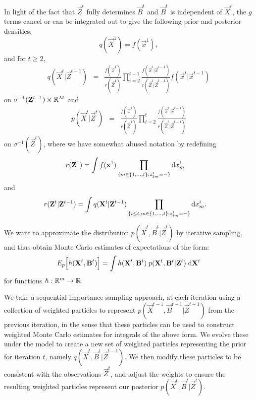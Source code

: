 In light of the fact that $\vec{Z}^t$ fully determines $\vec{B}^t$ and $\vec{B}^t$ is independent of $\vec{X}^t$, the $g$ terms cancel or can be integrated out to give the following prior and posterior densities:
\[
q(\vec{X}^1) = f(\vec{x}^1),
\]
and for $t \geq 2$,
\begin{eqnarray*}
    q(\vec{X}^t | \vec{Z}^{t-1}) & = & \frac{f(\vec{x}^1)}{r(\vec{Z}^1)} \prod_{i=2}^{t-1} \frac{f(\vec{x}^i | \vec{x}^{i-1}) }{r(\vec{Z}^t | \vec{Z}^{t-1})} f(\vec{x}^t | \vec{x}^{t-1})
\end{eqnarray*}
on $\sigma^{-1}(\mathbf{Z}^{t-1}) \times \mathbb R^M $ and 
\begin{eqnarray*}
    p(\vec{X}^t | \vec{Z}^t) 
& = & \frac{f(\vec{x}^1)}{r(\vec{Z}^1)} \prod_{i=2}^t \frac{f(\vec{x}^i | \vec{x}^{i-1}) }{r(\vec{Z}^t | \vec{Z}^{t-1})} 
\end{eqnarray*}
on $\sigma^{-1}(\vec{Z}^t)$, where we have somewhat abused notation by redefining
\begin{align*}
    r(\mathbf{Z}^1)  &= \int f(\mathbf{x}^1) \prod_{ \{m \in \{1, \ldots, t \} : z^1_{1m} = - \} } \mathrm{d} x^1_m
\end{align*}
and
\begin{align*}
    r(\mathbf{Z}^t | \mathbf{Z}^{t-1})  &= \int q(\mathbf{X}^t | \mathbf{Z}^{t-1}) \prod_{ \{ i \leq t, m \in \{1, \ldots, t \} : z^t_{im} = - \} } \mathrm{d} x^i_m.
\end{align*}



We want to approximate the distribution $p(\vec{X}^{t}, \vec{B}^{t} | \vec{Z}^{t})$ by iterative sampling, and thus obtain Monte Carlo estimates of expectations of the form:
\begin{equation*}
    E_{p} \Big[h(\mathbf{X}^{t}, \mathbf{B}^{t} ) \Big] = \int h(\mathbf{X}^{t}, \mathbf{B}^{t})\; p(\mathbf{X}^{t}, \mathbf{B}^{t} | \mathbf{Z}^{t})\; \mathrm{d} \mathbf{X}^{t}
\end{equation*}
for functions $h: \mathbb R^m  \rightarrow \mathbb R$. 

We take a sequential importance sampling approach, at each iteration using a collection of weighted particles to represent $p(\vec{X}^{t-1}, \vec{B}^{t-1} | \vec{Z}^{t-1})$ from the previous iteration, in the sense that these particles can be used to construct weighted Monte Carlo estimates for integrals of the above form. We evolve these under the model to create a new set of weighted particles representing the prior for iteration $t$, namely $q(\vec{X}^{t}, \vec{B}^{t} | \vec{Z}^{t-1})$. We then modify these particles to be consistent with the observations $\vec{Z}^{t}$, and adjust the weights to ensure the resulting weighted particles represent our posterior $p(\vec{X}^{t}, \vec{B}^{t} | \vec{Z}^{t})$.

